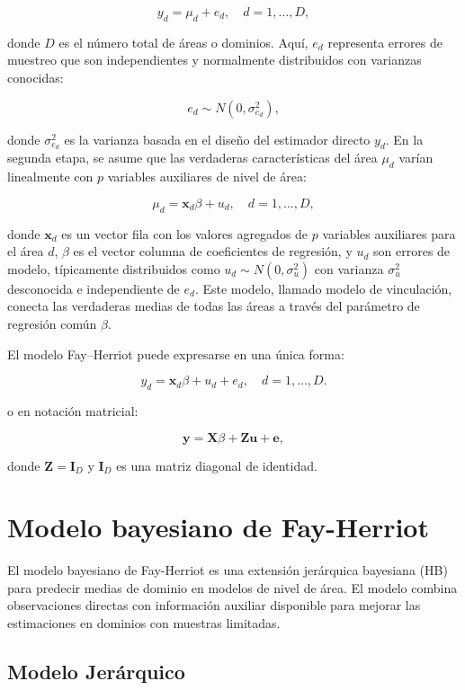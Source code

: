 \documentclass[12pt,spanish]{article}
\begin{document}
\[
y_d = \mu_d + e_d, \quad d = 1, \dots, D,
\]

donde \(D\) es el número total de áreas o dominios. Aquí, \(e_d\) representa errores de muestreo que son independientes y normalmente distribuidos con varianzas conocidas:

\[
e_d \sim N(0, \sigma^2_{e_d}),
\]

donde \(\sigma^2_{e_d}\) es la varianza basada en el diseño del estimador directo \(y_d\). En la segunda etapa, se asume que las verdaderas características del área \(\mu_d\) varían linealmente con \(p\) variables auxiliares de nivel de área:

\[
\mu_d = \mathbf{x}_d\beta + u_d, \quad d = 1, \dots, D,
\]

donde \(\mathbf{x}_d\) es un vector fila con los valores agregados de \(p\) variables auxiliares para el área \(d\), \(\beta\) es el vector columna de coeficientes de regresión, y \(u_d\) son errores de modelo, típicamente distribuidos como \(u_d \sim N(0, \sigma^2_u)\) con varianza \(\sigma^2_u\) desconocida e independiente de \(e_d\). Este modelo, llamado modelo de vinculación, conecta las verdaderas medias de todas las áreas a través del parámetro de regresión común \(\beta\).

El modelo Fay--Herriot puede expresarse en una única forma:

\[
y_d = \mathbf{x}_d\beta + u_d + e_d, \quad d = 1, \dots, D.
\]

o en notación matricial:

\[
\mathbf{y} = \mathbf{X}\beta + \mathbf{Z}\mathbf{u} + \mathbf{e},
\]

donde \(\mathbf{Z} = \mathbf{I}_D\) y \(\mathbf{I}_D\) es una matriz diagonal de identidad.

\section*{Modelo bayesiano de Fay-Herriot}

El modelo bayesiano de Fay-Herriot es una extensión jerárquica bayesiana (HB) para predecir medias de dominio en modelos de nivel de área. El modelo combina observaciones directas con información auxiliar disponible para mejorar las estimaciones en dominios con muestras limitadas.

\subsection*{Modelo Jerárquico}
\end{document}
